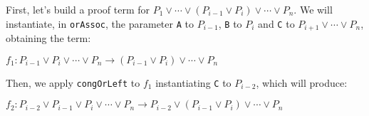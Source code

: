 

First, let's build a proof term for $P_{1} \vee \cdots \vee (P_{i - 1} \vee P_{i}) \vee \cdots \vee P_{n}$. We will instantiate, in \texttt{orAssoc}, the parameter \texttt{A} to $P_{i - 1}$, \texttt{B} to $P_{i}$ and \texttt{C} to $P_{i + 1} \vee \cdots \vee P_{n}$, obtaining the term:

\begin{center}
    $f_{1}: P_{i - 1} \vee P_{i} \vee \cdots \vee P_{n}   \rightarrow (P_{i - 1} \vee P_{i}) \vee \cdots \vee P_{n} $
\end{center}

Then, we apply \texttt{congOrLeft} to $f_{1}$ instantiating \texttt{C} to $P_{i - 2}$, which will produce:

\begin{center}
    $f_{2}: P_{i - 2} \vee P_{i - 1} \vee P_{i} \vee \cdots \vee P_{n}   \rightarrow P_{i - 2} \vee (P_{i - 1} \vee P_{i}) \vee \cdots \vee P_{n} $
\end{center}

